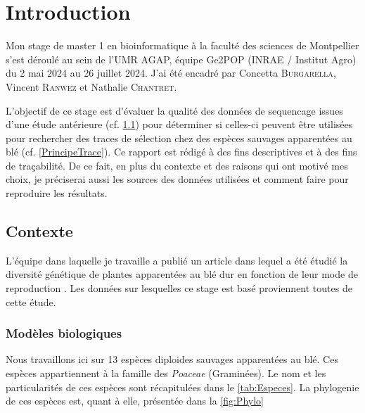 \documentclass[../main]{subfiles} %
\begin{document}
\addto\extrasfrench{\protected\edef:{\unexpanded\expandafter{:}}}



\section{Introduction}

Mon stage de master 1 en bioinformatique à la faculté des sciences de Montpellier s’est déroulé au sein de 
l’UMR AGAP, équipe Ge2POP (INRAE / Institut Agro) du 2 mai 2024 au 26 juillet 2024. J’ai été encadré par Concetta \textsc{Burgarella}, Vincent \textsc{Ranwez} et Nathalie \textsc{Chantret}. 

L’objectif de ce stage est d’évaluer la qualité des données de \gls{sequencage} issues d’une étude antérieure (cf. \cref{Contexte}) pour déterminer si celles-ci peuvent être utilisées pour rechercher des traces de sélection chez des espèces sauvages apparentées au blé (cf. \cref{PrincipeTrace}). Ce rapport est rédigé à des fins descriptives et à des fins de traçabilité. De ce fait,  en plus du contexte et des raisons qui ont motivé mes choix, je préciserai aussi les sources des données utilisées et comment faire pour reproduire les résultats.

\subsection{Contexte}
\label{Contexte}
L’équipe dans laquelle je travaille a publié un article dans lequel a été étudié la diversité génétique de plantes apparentées au blé dur en fonction de leur mode de reproduction \cite{burgarella_mating_2024}. Les données sur lesquelles ce stage est basé proviennent toutes de cette étude.

\subsubsection{Modèles biologiques}
\label{model_bio}
Nous travaillons ici sur 13 espèces \glspl{diploide} sauvages apparentées au blé. Ces espèces appartiennent à la famille des \textit{Poaceae} (Graminées). Le nom et les particularités de ces espèces sont récapitulées dans le \cref{tab:Especes}. La \gls{phylogenie} de ces espèces est, quant à elle, présentée dans la \cref{fig:Phylo}



\end{document}
